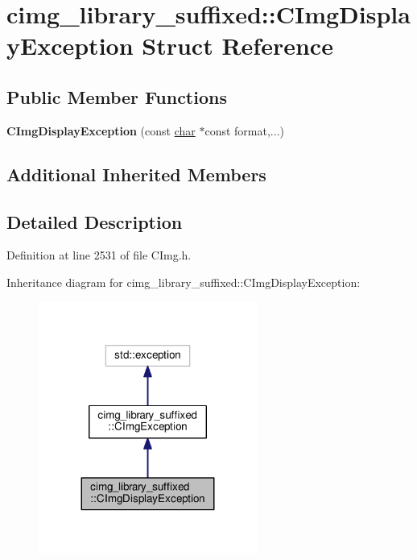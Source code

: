\hypertarget{structcimg__library__suffixed_1_1CImgDisplayException}{}\section{cimg\+\_\+library\+\_\+suffixed\+:\+:C\+Img\+Display\+Exception Struct Reference}
\label{structcimg__library__suffixed_1_1CImgDisplayException}
\subsection*{Public Member Functions}
\begin{DoxyCompactItemize}
\item 
\mbox{\label{structcimg__library__suffixed_1_1CImgDisplayException_aafc67056995f77844b87464aee4a0c81}} 
{\bfseries C\+Img\+Display\+Exception} (const \hyperlink{classchar}{char} $\ast$const format,...)
\end{DoxyCompactItemize}
\subsection*{Additional Inherited Members}


\subsection{Detailed Description}


Definition at line 2531 of file C\+Img.\+h.



Inheritance diagram for cimg\+\_\+library\+\_\+suffixed\+:\+:C\+Img\+Display\+Exception\+:
\nopagebreak
\begin{figure}[H]
\begin{center}
\leavevmode
\includegraphics[width=203pt]{d7/dbf/structcimg__library__suffixed_1_1CImgDisplayException__inherit__graph}
\end{center}
\end{figure}


